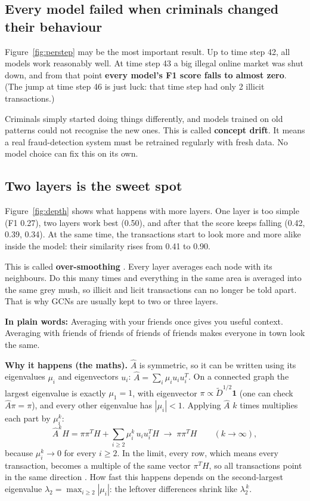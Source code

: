 \documentclass[11pt,a4paper]{article}
\newcommand{\Ahat}{\hat{A}}
\newcommand{\plain}[1]{\par\noindent\colorbox{notebg}{\parbox{\dimexpr\linewidth-2\fboxsep}{\small\textbf{In plain words:} #1}}\par}
\begin{document}
\subsection{Every model failed when criminals changed their behaviour}
Figure~\ref{fig:perstep} may be the most important result. Up to time step 42, all models work reasonably well. At time step 43
a big illegal online market was shut down, and from that point \textbf{every model's F1 score falls to almost zero}. (The jump at
time step 46 is just luck: that time step had only 2 illicit transactions.)

Criminals simply started doing things differently, and models trained on old patterns could not recognise the new ones. This is
called \textbf{concept drift}. It means a real fraud-detection system must be retrained regularly with fresh data. No model
choice can fix this on its own.

\subsection{Two layers is the sweet spot}
\label{sec:oversmooth}
Figure~\ref{fig:depth} shows what happens with more layers. One layer is too simple (F1 0.27), two layers work best (0.50), and
after that the score keeps falling (0.42, 0.39, 0.34). At the same time, the transactions start to look more and more alike
inside the model: their similarity rises from 0.41 to 0.90.

This is called \textbf{over-smoothing} \cite{li}. Every layer averages each node with its neighbours. Do this many times and everything
in the same area is averaged into the same grey mush, so illicit and licit transactions can no longer be told apart. That is
why GCNs are usually kept to two or three layers.

\plain{Averaging with your friends once gives you useful context. Averaging with friends of friends of friends of friends
makes everyone in town look the same.}

\textbf{Why it happens (the maths).} $\Ahat$ is symmetric, so it can be written using its eigenvalues $\mu_i$ and
eigenvectors $u_i$: $\Ahat = \sum_i \mu_i u_i u_i^{T}$. On a connected graph the largest eigenvalue is exactly
$\mu_1 = 1$, with eigenvector $\pi \propto \tilde D^{1/2}\mathbf 1$ (one can check $\Ahat\pi = \pi$), and every other eigenvalue
has $|\mu_i| < 1$. Applying $\Ahat$ $k$ times multiplies each part by $\mu_i^k$:
\[
  \Ahat^{k} H = \pi\pi^{T} H + \sum_{i\ge 2} \mu_i^{k}\, u_i u_i^{T} H \;\longrightarrow\; \pi\pi^{T} H
  \qquad (k \to \infty),
\]
because $\mu_i^k \to 0$ for every $i \ge 2$. In the limit, every row, which means every transaction, becomes a multiple of
the same vector $\pi^T H$, so all transactions point in the same direction \cite{li,oono}. How fast this happens depends on
the second-largest eigenvalue $\lambda_2 = \max_{i\ge2}|\mu_i|$: the leftover differences shrink like $\lambda_2^{\,k}$.
\end{document}
